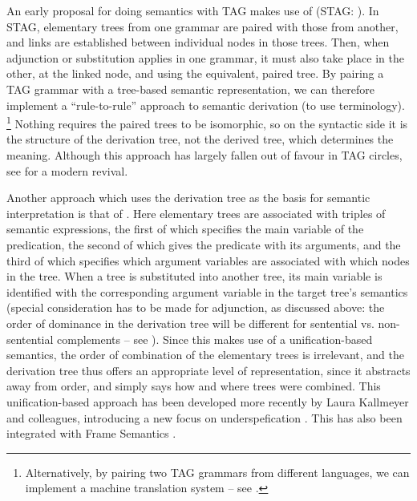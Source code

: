 \documentclass[output=paper,hidelinks]{langscibook}
\begin{document}
An early proposal for doing semantics with TAG makes use of 
(STAG: \citealp{shieber-schabes1990}). In STAG, elementary trees from one
grammar are paired with those from another, and links are established between
individual nodes in those trees. Then, when adjunction or substitution applies
in one grammar, it must also take place in the other, at the linked node, and
using the equivalent, paired tree. By pairing a TAG grammar with a tree-based
semantic representation, we can therefore implement a ``rule-to-rule'' approach
to semantic derivation (to use  terminology).%
%
\footnote{Alternatively, by pairing two TAG grammars from different languages,
  we can implement a machine translation system -- see
  \citet{abeille:translation}.}
%
Nothing requires the paired trees to be isomorphic, so on the syntactic side it
is the structure of the derivation tree, not the derived tree, which determines
the meaning. Although this approach has largely fallen out of favour in TAG
circles, see \citet{nesson:stag,Nesson:Shieber:07,Nesson:Shieber:08} for a
modern revival.

Another approach which uses the derivation tree as the basis for semantic
interpretation is that of \citet{joshi:semantics-published}. Here elementary
trees are associated with triples of semantic expressions, the first of which
specifies the main variable of the predication, the second of which gives the
predicate with its arguments, and the third of which specifies which argument
variables are associated with which nodes in the tree. When a tree is
substituted into another tree, its main variable is identified with the
corresponding argument variable in the target tree's semantics (special
consideration has to be made for adjunction, as discussed above: the order of
dominance in the derivation tree will be different for sentential vs.
non-sentential complements -- see \citealt[152f.]{joshi:semantics-published}).
Since this makes use of a unification-based semantics, the order of combination
of the elementary trees is irrelevant, and the derivation tree thus offers an
appropriate level of representation, since it abstracts away from order, and
simply says how and where trees were combined. This unification-based approach
has been developed more recently by Laura Kallmeyer and colleagues, introducing
a new focus on underspefication
\citep{gardent:semantics-ftag,kallmeyer:factoring,kallmeyer:unification,kallmeyer:scope}.
This has also been integrated with Frame Semantics
\citep{kallmeyer:frame-semantics}.
\end{document}
